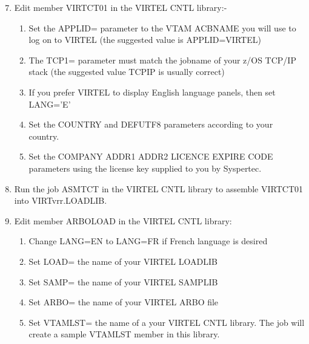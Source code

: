 \documentclass[letterpaper,10pt,english]{sphinxmanual}
\begin{document}
\begin{sphinxVerbatim}[commandchars=\\\{\}]
 
\end{sphinxVerbatim}
\begin{enumerate}
\setcounter{enumi}{6}
\item {} 
Edit member VIRTCT01 in the VIRTEL CNTL library:-
\begin{enumerate}
\item {} 
Set the APPLID= parameter to the VTAM ACBNAME you will use to log on to VIRTEL (the suggested value is APPLID=VIRTEL)

\item {} 
The TCP1= parameter must match the jobname of your z/OS TCP/IP stack (the suggested value TCPIP is usually correct)

\item {} 
If you prefer VIRTEL to display English language panels, then set LANG=’E’

\item {} 
Set the COUNTRY and DEFUTF8 parameters according to your country.

\item {} 
Set the COMPANY ADDR1 ADDR2 LICENCE EXPIRE CODE parameters using the license key supplied to you by Syspertec.

\end{enumerate}

\item {} 
Run the job ASMTCT in the VIRTEL CNTL library to assemble VIRTCT01 into VIRTvrr.LOADLIB.

\item {} 
Edit member ARBOLOAD in the VIRTEL CNTL library:
\begin{enumerate}
\item {} 
Change LANG=EN to LANG=FR if French language is desired

\item {} 
Set LOAD= the name of your VIRTEL LOADLIB

\item {} 
Set SAMP= the name of your VIRTEL SAMPLIB

\item {} 
Set ARBO= the name of your VIRTEL ARBO file

\item {} 
Set VTAMLST= the name of a your VIRTEL CNTL library. The job will create a sample VTAMLST member in this library.


\end{enumerate}
\end{enumerate}
\end{document}
